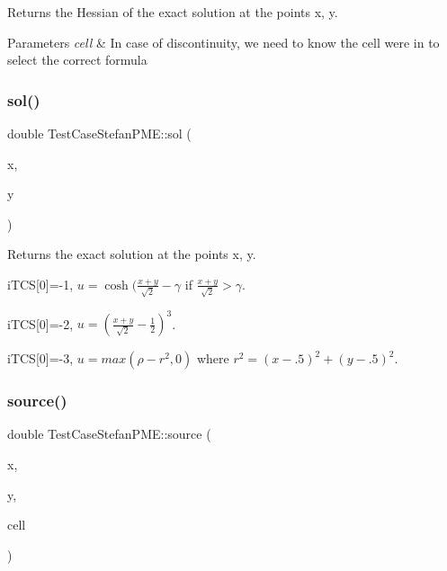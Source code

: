 Returns the Hessian of the exact solution at the points x, y. 


\begin{DoxyParams}{Parameters}
{\em cell} & In case of discontinuity, we need to know the cell we\textquotesingle{}re in to select the correct formula \\
\hline
\end{DoxyParams}
\mbox{\label{classTestCaseStefanPME_adb724181b45dfacc154d6bbc2fe66aed}} 
\subsubsection{\texorpdfstring{sol()}{sol()}}
{\footnotesize\ttfamily double Test\+Case\+Stefan\+P\+M\+E\+::sol (\begin{DoxyParamCaption}\item[{const double}]{x,  }\item[{const double}]{y }\end{DoxyParamCaption})}



Returns the exact solution at the points x, y. 

i\+T\+CS\mbox{[}0\mbox{]}=-\/1, $u=\cosh(\frac{x+y}{\sqrt{2}}-\gamma$ if $\frac{x+y}{\sqrt{2}}>\gamma$.

i\+T\+CS\mbox{[}0\mbox{]}=-\/2, $u=(\frac{x+y}{\sqrt{2}}-\frac12)^3$.

i\+T\+CS\mbox{[}0\mbox{]}=-\/3, $u=max(\rho - r^2, 0)$ where $r^2=(x-.5)^2+(y-.5)^2$. \mbox{\label{classTestCaseStefanPME_a674169b5716f534375eabde0b5b2e7f3}} 
\subsubsection{\texorpdfstring{source()}{source()}}
{\footnotesize\ttfamily double Test\+Case\+Stefan\+P\+M\+E\+::source (\begin{DoxyParamCaption}\item[{const double}]{x,  }\item[{const double}]{y,  }\item[{const \hyperlink{classHArDCore2D_1_1Cell}{Cell} $\ast$}]{cell }\end{DoxyParamCaption})}



